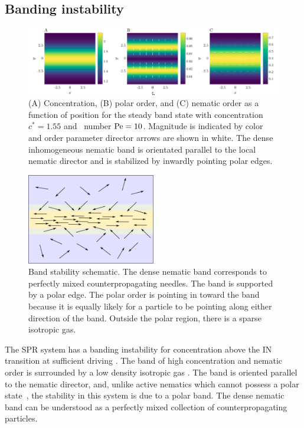 \subsection{Banding instability}
\begin{figure}[!b]
	\centering
  \includegraphics[width=1.00\textwidth]{figs/ch04_active/band_example_paper.png}
  \caption[Banding instability]
  {(A) Concentration, (B) polar order, and (C) nematic order 
    as a function of position for the steady band
    state with concentration $c^* = 1.55$ and \peclet~number $\text{Pe} = 10$.
    Magnitude is indicated by color and order parameter director arrows are 
    shown in white. The dense inhomogeneous nematic band is orientated parallel 
    to the local nematic director and is stabilized by inwardly pointing polar
    edges.}\label{fig:band}
\end{figure}
\begin{figure}[!t]
	\centering
  \includegraphics[width=0.50\textwidth]{figs/ch04_active/band_cartoon_paper.png}
  \caption[Band stability schematic]
  {Band stability schematic. The dense nematic band corresponds to
    perfectly mixed counterpropagating needles. The band is supported by a polar
    edge. The polar order is pointing in toward the band because it is equally
    likely for a particle to be pointing along either direction of the band.
    Outside the
    polar region, there is a sparse isotropic gas.}\label{fig:band_cartoon}
\end{figure}


The SPR system has a banding instability for concentration above the IN
transition at sufficient driving . The band of high concentration
and nematic order is surrounded by a low density isotropic gas
.  The band is oriented parallel to the nematic
director, and, unlike active nematics which cannot possess a polar
state~\cite{putzig_phase_14}, the stability in this system is due to a polar
band. The dense
nematic band can be understood as a perfectly mixed collection of
counterpropagating particles.

